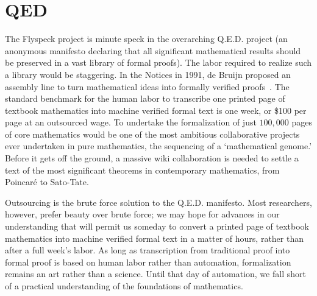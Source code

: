 \documentclass{llncs}
\begin{document}
\section{QED}

%
%
%

The Flyspeck project is minute speck in the overarching Q.E.D. project
(an anonymous manifesto declaring that all significant mathematical results should be preserved in a vast library of formal proofs).
The labor required to realize such a library would be staggering.
In the Notices in 1991, de Bruijn proposed an assembly line
to turn mathematical ideas into formally verified proofs~\cite{dB91}.
The standard benchmark for the
human labor to transcribe one printed page
of textbook mathematics into machine verified formal text is one week, or \$100 per page at an outsourced wage. To undertake the formalization of just $100,000$ pages
of core mathematics 
would be one of the most ambitious collaborative projects ever undertaken in pure mathematics, the sequencing of a `mathematical genome.'
Before it gets off the ground, a massive wiki collaboration is needed to
 settle  a %
text of the most significant theorems in contemporary mathematics, from 
Poincar\'e to Sato-Tate.  %

Outsourcing is the brute force solution to the Q.E.D. manifesto.  Most researchers, however, prefer beauty over brute force;
we may hope for advances in our 
understanding that will permit us someday to convert a printed page of textbook mathematics into machine verified formal text in a matter of hours, rather than after a full week's labor.  As long as
transcription from traditional
proof into formal proof is based on human labor rather than
automation, formalization remains an art rather than a science.
Until that day of automation, %
we fall short of a practical understanding of the foundations of mathematics.
\end{document}
